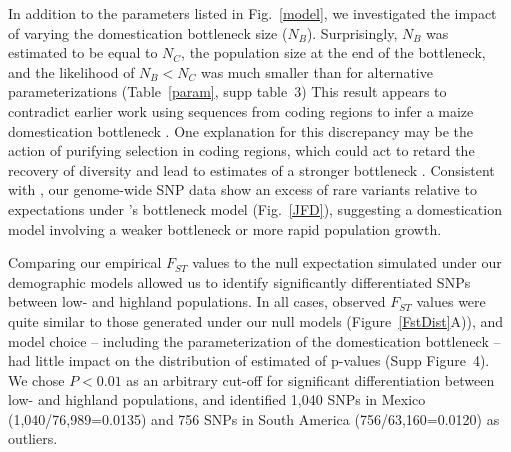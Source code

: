 In addition to the parameters listed in Fig.~\ref{model}, we investigated the impact of varying the domestication bottleneck size ($N_B$).  
Surprisingly, $N_B$ was estimated to be equal to $N_C$, the population size at the end of the bottleneck, and the likelihood of $N_B<N_C$ was much smaller than for alternative parameterizations (Table~\ref{param}, supp table~3) 
This result appears to contradict earlier work using sequences from coding regions to infer a maize domestication bottleneck \cite{Wright_2005_15919994, Tenaillon2004}.  One explanation for this discrepancy may be the action of purifying selection in coding regions, which could act to retard the recovery of diversity and lead to estimates of a stronger bottleneck \cite{Hufford_2012_22660546}.  Consistent with \citet{Hufford_2012_22660546}, our genome-wide SNP data show an excess of rare variants relative to expectations under \cite{Wright_2005_15919994}'s bottleneck model (Fig.~\ref{JFD}), suggesting a domestication model involving a weaker bottleneck or more rapid population growth.

Comparing our empirical $F_{ST}$ values to the null expectation simulated under our demographic models allowed us to identify significantly differentiated SNPs between low- and highland populations. In all cases, observed $F_{ST}$ values were quite similar to those generated under our null models  (Figure~\ref{FstDist}A)), and model choice -- including the parameterization of the domestication bottleneck -- had little impact on the distribution of estimated of p-values (Supp Figure~4). We chose $P<0.01$ as an arbitrary cut-off for significant differentiation between low- and highland populations, and identified 1,040 SNPs in Mexico (1,040/76,989=0.0135) and 756 SNPs in South America (756/63,160=0.0120) as outliers.  

%

